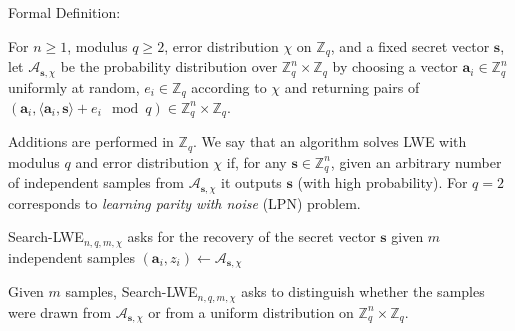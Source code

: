 \documentclass[
  a4paper,  %
  twoside,  %
  bibliography=totoc,
  headsepline,
  cleardoublepage=empty,
  parskip=half,
  draft=false
]{scrbook}
\begin{document}
Formal Definition: 
\begin{definition} %
  For $n \geq 1$, modulus $q \geq 2$, error distribution $\chi$ on $\mathbb{Z}_q$, and a fixed secret vector $\mathbf{s}$, let $\mathcal{A}_{\mathbf{s}, \chi}$ be the probability distribution over $\mathbb{Z}_q^n \times \mathbb{Z}_q$ by choosing a vector $\mathbf{a}_i \in \mathbb{Z}_q^n$ uniformly at random, $e_i \in \mathbb{Z}_q$ according to $\chi$ and returning pairs of $(\mathbf{a}_i, \langle \mathbf{a}_i, \mathbf{s} \rangle + e_i \mod q) \in \mathbb{Z}_q^n \times \mathbb{Z}_q$.
\end{definition}

Additions are performed in $\mathbb{Z}_q$. We say that an algorithm solves LWE with modulus $q$ and error distribution $\chi$ if, for any $\mathbf{s} \in \mathbb{Z}_q^n$, given an arbitrary number of independent samples from $\mathcal{A}_{\mathbf{s}, \chi}$ it outputs $\mathbf{s}$ (with high probability). For $q=2$ corresponds to \textit{learning parity with noise} (LPN) problem. %

\begin{definition} %
  Search-LWE$_{n, q, m, \chi}$ asks for the recovery of the secret vector $\mathbf{s}$ given $m$ independent samples $(\mathbf{a}_i, z_i) \leftarrow \mathcal{A}_{\mathbf{s}, \chi}$ %
\end{definition}

\begin{definition}
  Given $m$ samples, Search-LWE$_{n, q, m, \chi}$ asks to distinguish whether the samples were drawn from  $\mathcal{A}_{\mathbf{s}, \chi}$ or from a uniform distribution on $\mathbb{Z}_q^n \times \mathbb{Z}_q$.
\end{definition}

\end{document}
